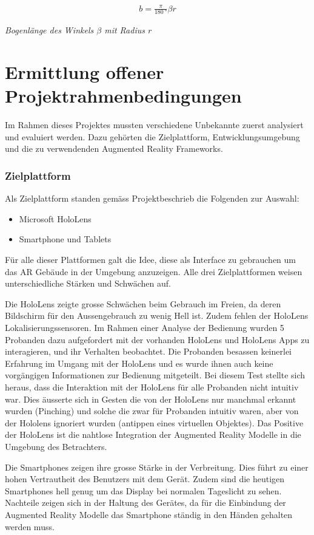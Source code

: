 \documentclass[a4paper]{scrreprt}
\newcommand{\myequations}[1]{
	\addcontentsline{equ}{myequations}{\protect\numberline{\theequation}#1}
}
\newcommand{\indexequation}[3]{
	\begin{align} \label{#3} \ensuremath{\boxed{#1}} \end{align}
	\myequations{#3} \centering \small \textit{#2} \normalsize \justify }
\begin{document}
\indexequation{b = \frac{\pi}{\SI{180}{\degree}}\beta r}{Bogenlänge des Winkels $\beta$ mit Radius $r$}{Bogenlaenge}

\section{Ermittlung offener Projektrahmenbedingungen}
\label{sec:evaluation}
Im Rahmen dieses Projektes mussten verschiedene Unbekannte zuerst analysiert und evaluiert werden. Dazu gehörten die Zielplattform, Entwicklungsumgebung und die zu verwendenden Augmented Reality Frameworks.
\subsubsection{Zielplattform}
Als Zielplattform standen gemäss Projektbeschrieb die Folgenden zur Auswahl:
\begin{itemize}
\item Microsoft HoloLens
\item Smartphone und Tablets
\end{itemize}
Für alle dieser Plattformen galt die Idee, diese als Interface zu gebrauchen um das AR Gebäude in der Umgebung anzuzeigen. Alle drei Zielplattformen weisen unterschiedliche Stärken und Schwächen auf.

Die HoloLens zeigte grosse Schwächen beim Gebrauch im Freien, da deren Bildschirm für den Aussengebrauch zu wenig Hell ist. Zudem fehlen der HoloLens Lokalisierungssensoren. Im Rahmen einer Analyse der Bedienung wurden 5 Probanden dazu aufgefordert mit der vorhanden HoloLens und HoloLens Apps zu interagieren, und ihr Verhalten beobachtet. Die Probanden besassen keinerlei Erfahrung im Umgang mit der HoloLens und es wurde ihnen auch keine vorgängigen Informationen zur Bedienung mitgeteilt. Bei diesem Test stellte sich heraus, dass die Interaktion mit der HoloLens für alle Probanden nicht intuitiv war. Dies äusserte sich in Gesten die von der HoloLens nur manchmal erkannt wurden (Pinching) und solche die zwar für Probanden intuitiv waren, aber von der Hololens ignoriert wurden (antippen eines virtuellen Objektes).
Das Positive der HoloLens ist die nahtlose Integration der Augmented Reality Modelle in die Umgebung des Betrachters. 
 
Die Smartphones zeigen ihre grosse Stärke in der Verbreitung. Dies führt zu einer hohen Vertrautheit des Benutzers mit dem Gerät. Zudem sind die heutigen Smartphones hell genug um das Display bei normalen Tageslicht zu sehen.
Nachteile zeigen sich in der Haltung des Gerätes, da für die Einbindung der Augmented Reality Modelle das Smartphone ständig in den Händen gehalten werden muss.
\end{document}
